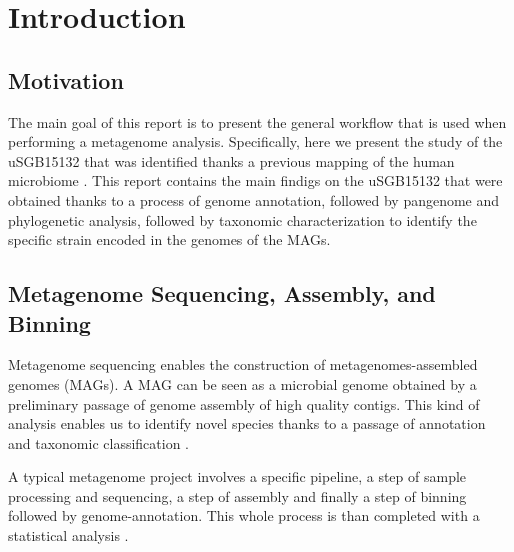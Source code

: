 \documentclass[a4paper,titlepage, oneside]{book}
\begin{document}
\begin{frontespizio}
\Istituzione{}
\Punteggiatura{}
\end{frontespizio}

\tableofcontents

\chapter{Introduction}

\section{Motivation}
The main goal of this report is to present the general workflow that is used when performing a metagenome analysis. Specifically, here we present the study of the uSGB15132 that was identified thanks a previous mapping of the human microbiome \cite{SGB2}.
This report contains the main findigs on the uSGB15132 that were obtained thanks to a process of genome annotation, followed by pangenome and phylogenetic analysis, followed by taxonomic characterization to identify the specific strain encoded in the genomes of the MAGs.



\section{Metagenome Sequencing, Assembly, and Binning}
Metagenome sequencing enables the construction of metagenomes-assembled genomes (MAGs). A MAG can be seen as a microbial genome obtained by a preliminary passage of genome assembly of high quality contigs. This kind of analysis enables us to identify novel species thanks to a passage of annotation and taxonomic classification \cite{MAG}.

A typical metagenome project involves a specific pipeline, a step of sample processing and sequencing, a step of assembly and finally a step of binning followed by genome-annotation. This whole process is than completed with a statistical analysis \cite{Metagenome}.
\end{document}
